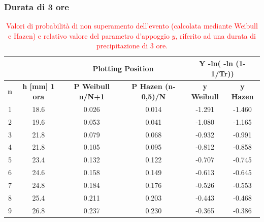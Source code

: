\subsubsection{Durata di 3 ore}
\begin{table}[H] \centering
    \caption{\textcolor{red}{Valori di probabilità di non superamento dell'evento (calcolata mediante Weibull e Hazen) e relativo valore del parametro d'appoggio $y$, riferito ad una durata di precipitazione di 3 ore.}}
\begin{tabular}{cccccc}
    &  & \multicolumn{2}{c}{\textbf{Plotting Position}} & \multicolumn{2}{c}{\textbf{Y -ln( -ln (1- 1/Tr))}}\\
    \toprule
       \textbf{n} & \textbf{h [mm] 1 ora} & \textbf{P Weibull   n/N+1} & \textbf{P Hazen  (n-0,5)/N} & \textbf{y Weibull} & \textbf{y Hazen}\\
   \midrule 
    1          & 18.6                      & 0.026                      & 0.014                       & -1.291                  & -1.460                  \\
    2          & 19.6                      & 0.053                      & 0.041                       & -1.080                  & -1.165                  \\
    3          & 21.8                      & 0.079                      & 0.068                       & -0.932                  & -0.991                  \\
    4          & 21.8                      & 0.105                      & 0.095                       & -0.812                  & -0.858                  \\
    5          & 23.4                      & 0.132                      & 0.122                       & -0.707                  & -0.745                  \\
    6          & 24.6                      & 0.158                      & 0.149                       & -0.613                  & -0.645                  \\
    7          & 24.8                      & 0.184                      & 0.176                       & -0.526                  & -0.553                  \\
    8          & 25.4                      & 0.211                      & 0.203                       & -0.443                  & -0.468                  \\
    9          & 26.8                      & 0.237                      & 0.230                       & -0.365                  & -0.386                  \\

\end{tabular}
\end{table}
